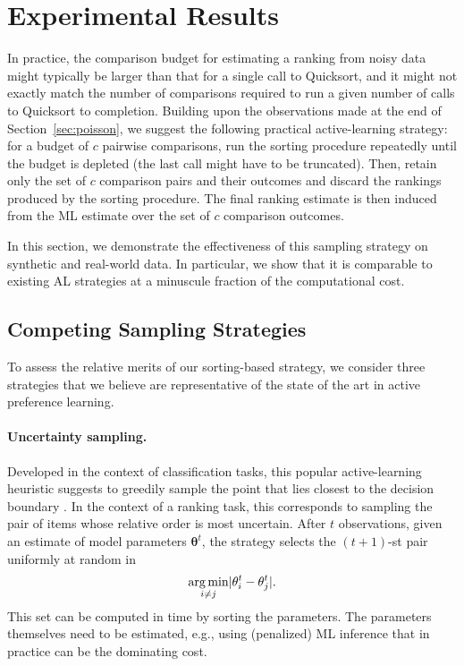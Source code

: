 \section{Experimental Results}  %
\label{sec:experiments}

In practice, the comparison budget for estimating a ranking from noisy data might typically be larger than that for a single call to Quicksort, and it might not exactly match the number of comparisons required to run a given number of calls to Quicksort to completion.
Building upon the observations made at the end of Section~\ref{sec:poisson}, we suggest the following practical active-learning strategy:
for a budget of $c$ pairwise comparisons, run the sorting procedure repeatedly until the budget is depleted (the last call might have to be truncated).
Then, retain only the set of $c$ comparison pairs and their outcomes and discard the rankings produced by the sorting procedure.
The final ranking estimate is then induced from the ML estimate over the set of $c$ comparison outcomes.

In this section, we demonstrate the effectiveness of this sampling strategy on synthetic and real-world data.
In particular, we show that it is comparable to existing AL strategies at a minuscule fraction of the computational cost.


\subsection{Competing Sampling Strategies}

To assess the relative merits of our sorting-based strategy, we consider three strategies that we believe are representative of the state of the art in active preference learning.

\paragraph{Uncertainty sampling.}
Developed in the context of classification tasks, this popular active-learning heuristic suggests to greedily sample the point that lies closest to the decision boundary \citep{settles2012active}.
In the context of a ranking task, this corresponds to sampling the pair of items whose relative order is most uncertain.
After $t$ observations, given an estimate of model parameters $\bm{\theta}^t$, the strategy selects the $(t\!+\!1)$-st pair uniformly at random in
\begin{align*}
\operatorname*{arg\,min}_{i \ne j} \lvert \theta^t_i - \theta^t_j \rvert.
\end{align*}
This set can be computed in time  by sorting the parameters.
The parameters themselves need to be estimated, e.g., using (penalized) ML inference that in practice can be the dominating cost.

